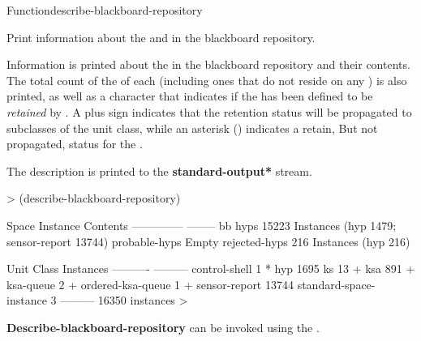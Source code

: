 \documentclass[10pt,twoside,english,pdftex]{article}
\begin{document}
\begin{functiondoc}{Function}{describe-blackboard-repository}{\noargs}

\fnsyntax

\fnpurpose {}%
%
%
Print information about the  and  in the
blackboard repository.

\fnpackage {}

\fnmodule {}

\fndescription
{}%
%
Information is printed about the  in the blackboard
repository and their contents.  The total count of the
 of each  (including ones that
do not reside on any ) is also printed, as well
as a character that indicates if the  has been
defined to be \textit{retained} by
.  A plus sign
indicates that the retention status will be propagated to subclasses
of the unit class, while an asterisk (\code{*}) indicates a retain,
But not propagated, status for the .

The description is printed to the {\bf *standard-output*} stream.

\fnexample
%
\W\supp
\begin{example}
  > (describe-blackboard-repository)

  Space Instance              Contents
  --------------              --------
  bb                            
     hyps                     15223 Instances (hyp 1479; sensor-report 13744)
     probable-hyps            Empty
     rejected-hyps            216 Instances (hyp 216)

  Unit Class                  Instances
  ----------                  ---------
  control-shell                       1 *
  hyp                              1695
  ks                                 13 + 
  ksa                               891 +
  ksa-queue                           2 +
  ordered-ksa-queue                   1 +
  sensor-report                   13744
  standard-space-instance             3
                              ---------
                                  16350 instances
>
\end{example}

\replnote 
%
%
%
\textbf{Describe-blackboard-repository} can be invoked using the
 .

\end{functiondoc}
\end{document}
